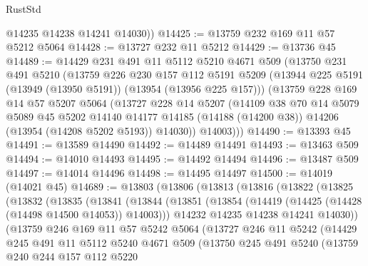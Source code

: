 \begin{lexlean}{RustStd}
\begin{coremodule}
        @14235
        @14238
        @14241
        @14030))
@14425 := @13759 @232 @169 @11 @57 @5212 @5064
@14428 := @13727 @232 @11 @5212
@14429 := @13736 @45
@14489 := @14429
    @231
    @491
    @11
    @5112
    @5210
    @4671
    @509
    (@13750
      @231
      @491
      @5210
      (@13759
        @226
        @230
        @157
        @112
        @5191
        @5209
        (@13944 @225 @5191 (@13949 (@13950 @5191)) (@13954 (@13956 @225 @157)))
        (@13759
          @228
          @169
          @14
          @57
          @5207
          @5064
          (@13727
            @228
            @14
            @5207
            (@14109
              @38
              @70
              @14
              @5079
              @5089
              @45
              @5202
              @14140
              @14177
              @14185
              (@14188 (@14200 @38))
              @14206
              (@13954 (@14208 @5202 @5193))
              @14030))
          @14003)))
@14490 := @13393 @45
@14491 := @13589 @14490
@14492 := @14489 @14491
@14493 := @13463 @509
@14494 := @14010 @14493
@14495 := @14492 @14494
@14496 := @13487 @509
@14497 := @14014 @14496
@14498 := @14495 @14497
@14500 := @14019 (@14021 @45)
@14689 := @13803
    (@13806
      (@13813
        (@13816
          (@13822
            (@13825
              (@13832
                (@13835
                  (@13841
                    (@13844
                      (@13851
                        (@13854 (@14419 (@14425 (@14428 (@14498 @14500 @14053)) @14003)))
                        @14232
                        @14235
                        @14238
                        @14241
                        @14030))
                    (@13759
                      @246
                      @169
                      @11
                      @57
                      @5242
                      @5064
                      (@13727
                        @246
                        @11
                        @5242
                        (@14429
                          @245
                          @491
                          @11
                          @5112
                          @5240
                          @4671
                          @509
                          (@13750
                            @245
                            @491
                            @5240
                            (@13759
                              @240
                              @244
                              @157
                              @112
                              @5220

\end{coremodule}
\end{lexlean}
